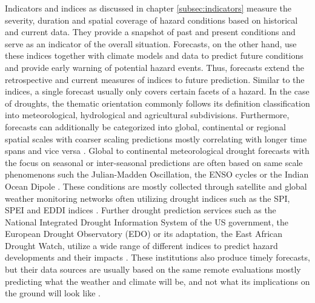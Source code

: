 Indicators and indices as discussed in chapter \ref{subsec:indicators} measure the severity, duration and spatial coverage of hazard conditions based on historical and current data. They provide a snapshot of past and present conditions and serve as an indicator of the overall situation. Forecasts, on the other hand, use these indices together with climate models and data to predict future conditions and provide early warning of potential hazard events. Thus, forecasts extend the retrospective and current measures of indices to future prediction.\newline
Similar to the indices, a single forecast usually only covers certain facets of a hazard. In the case of droughts, the thematic orientation commonly follows its definition classification into meteorological, hydrological and agricultural subdivisions. Furthermore, forecasts can additionally be categorized into global, continental or regional spatial scales with coarser scaling predictions mostly correlating with longer time spans and vice versa \autocite{baltiReviewDroughtMonitoring2020}. Global to continental meteorological drought forecasts with the focus on seasonal or inter-seasonal predictions are often based on same scale phenomenons such the Julian-Madden Oscillation, the ENSO cycles or the Indian Ocean Dipole \autocite{andersonMaddenJulianOscillationAffects2022,goreUnderstandingInfluenceENSO2020,yuanInfluencesIndianOcean2008}. These conditions are mostly collected through satellite and global weather monitoring networks often utilizing drought indices such as the SPI, SPEI and EDDI indices \autocite{kimIntegratedDroughtMonitoring2021}. Further drought prediction services such as the National Integrated Drought Information System of the US government, the European Drought Observatory (EDO) or its adaptation, the East African Drought Watch, utilize a wide range of different indices to predict hazard developments and their impacts \autocite{europeandroughtobservatoryDroughtIndicators2017,icpacDroughtIndicators2023, nidisOutlooksForecasts2023}. These institutions also produce timely forecasts, but their data sources are usually based on the same remote evaluations mostly predicting what the weather and climate will be, and not what its implications on the ground will look like \autocite{enenkelWhyPredictClimate2020}. 

